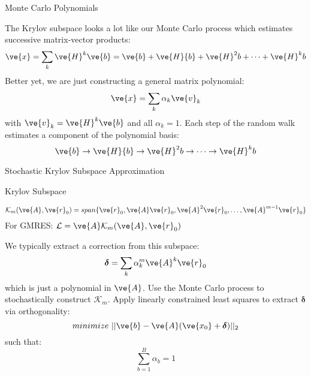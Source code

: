 \documentclass{beamer}
\begin{document}
\begin{frame}{Monte Carlo Polynomials}

  The Krylov subspace looks a lot like our Monte Carlo process which
  estimates successive matrix-vector products:
  \[
  \ve{x} = \sum_k \ve{H}^k\ve{b} = \ve{b} + \ve{H}{b} + \ve{H}^2{b} +
  \dots + \ve{H}^k{b}
  \]
  Better yet, we are just constructing a general matrix polynomial:
  \[
  \ve{x} = \sum_k \alpha_k \ve{v}_k
  \]
  with $\ve{v}_k = \ve{H}^k\ve{b}$ and all $\alpha_k=1$. Each step of
  the random walk estimates a component of the polynomial basis:
  \[
  \ve{b} \rightarrow \ve{H}{b} \rightarrow \ve{H}^2{b} \rightarrow
  \dots \rightarrow \ve{H}^k{b}
  \]
  
\end{frame}

\begin{frame}{Stochastic Krylov Subspace Approximation}

  \begin{beamerboxesrounded}[upper=boxheadcolor,lower=boxbodycolor,shadow=true]
    {Krylov Subspace}
    
    \[
    \mathcal{K}_m(\ve{A},\ve{r}_0) = span\{\ve{r}_0, \ve{A}\ve{r}_0,
    \ve{A}^2\ve{r}_0, \dots, \ve{A}^{m-1}\ve{r}_0\}
    \]
    For GMRES: $\mathcal{L} = \ve{A} \mathcal{K}_m(\ve{A},\ve{r}_0)$
  \end{beamerboxesrounded}

  We typically extract a correction from this subspace:
  \[
  \boldsymbol{\delta} = \sum_k \alpha_k^m \ve{A}^k \ve{r}_0
  \]
  which is just a polynomial in $\ve{A}$. Use the Monte Carlo process
  to stochastically construct $\mathcal{K}_m$. Apply linearly
  constrained least squares to extract $\boldsymbol{\delta}$ via
  orthogonality:
  \[
  minimize\ ||\ve{b} - \ve{A}(\ve{x_0}+\boldsymbol{\delta})||_2
  \]
  such that:
  \[
  \sum_{b=1}^B \alpha_b = 1
  \]

\end{frame}
\end{document}

